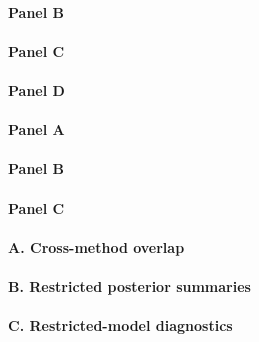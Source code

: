\paragraph*{Panel B}



\paragraph*{Panel C}



\paragraph*{Panel D}



\paragraph*{Panel A}



\paragraph*{Panel B}



\paragraph*{Panel C}



\paragraph*{A. Cross-method overlap}



\paragraph*{B. Restricted posterior summaries}



\paragraph*{C. Restricted-model diagnostics}

